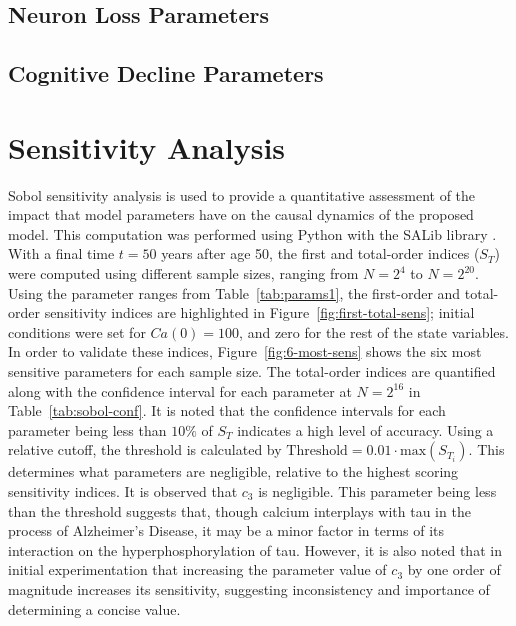 \documentclass[12pt]{article}
\theoremstyle{definition}
\begin{document}
\subsection{Neuron Loss Parameters}

\bigskip
\subsection{Cognitive Decline Parameters}

\bigskip
\section{Sensitivity Analysis}

Sobol sensitivity analysis is used to provide a quantitative assessment of the impact that model parameters have on the causal dynamics of the proposed model. This computation was performed using Python with the SALib library \cite{Herman2017, Iwanaga2022}. With a final time $t = 50$ years after age 50, the first and total-order indices ($S_T$) were computed using different sample sizes, ranging from $N=2^4$ to $N=2^{20}$. Using the parameter ranges from Table~\ref{tab:params1}, the first-order and total-order sensitivity indices are highlighted in Figure~\ref{fig:first-total-sens}; initial conditions were set for $Ca(0)=100$, and zero for the rest of the state variables. In order to validate these indices, Figure~\ref{fig:6-most-sens} shows the six most sensitive parameters for each sample size. The total-order indices are quantified along with the confidence interval for each parameter at $N=2^{16}$ in Table~\ref{tab:sobol-conf}. It is noted that the confidence intervals for each parameter being less than $10\%$ of $S_T$ indicates a high level of accuracy. Using a relative cutoff, the threshold is calculated by $\text{Threshold}=0.01 \cdot \text{max}(S_{T_i})$. This determines what parameters are negligible, relative to the highest scoring sensitivity indices. It is observed that $c_3$ is negligible. This parameter being less than the threshold suggests that, though calcium interplays with tau in the process of Alzheimer's Disease, it may be a minor factor in terms of its interaction on the hyperphosphorylation of tau. However, it is also noted that in initial experimentation that increasing the parameter value of $c_3$ by one order of magnitude increases its sensitivity, suggesting inconsistency and importance of determining a concise value. \bigskip
\end{document}
